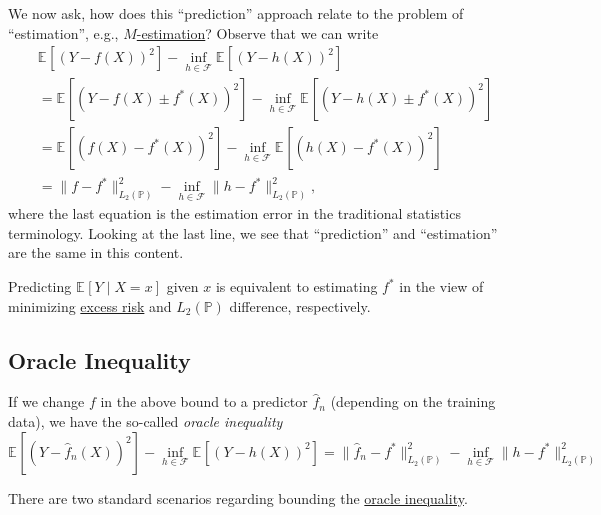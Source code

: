 We now ask, how does this ``prediction'' approach relate to the problem of ``estimation'', e.g., \hyperref[prb:M-estimation]{\(M\)-estimation}? Observe that we can write
\begin{align*}
	 & \mathbb{E}_{}\left[ ( Y - f(X) ) ^2 \right] - \inf _{h \in \mathscr{F} } \mathbb{E}_{}\left[( Y - h(X) ) ^2 \right]                                                      \\
	 & = \mathbb{E}_{}\left[ ( Y - f(X) \pm f^{\ast} (X) ) ^2 \right]  - \inf _{h \in \mathscr{F} } \mathbb{E}_{}\left[( Y - h(X) \pm f^{\ast} (X)) ^2 \right]                  \\
	 & = \mathbb{E}_{}\left[ ( f(X) - f^{\ast} (X) ) ^2 \right] - \inf _{h \in \mathscr{F} } \mathbb{E}_{}\left[( h(X) - f^{\ast} (X) ) ^2 \right] \tag*{cross terms are \(0\)} \\
	 & = \lVert f - f^{\ast}  \rVert _{L_2(\mathbb{P} )}^2 - \inf _{h\in \mathscr{F} } \lVert h - f^{\ast}  \rVert _{L_2(\mathbb{P} )} ^2,
\end{align*}
where the last equation is the estimation error in the traditional statistics terminology. Looking at the last line, we see that ``prediction'' and ``estimation'' are the same in this content.

\begin{intuition}
	Predicting \(\mathbb{E}_{}\left[Y \mid X = x \right] \) given \(x\) is equivalent to estimating \(f^{\ast} \) in the view of minimizing \hyperref[def:excess-risk]{excess risk} and \(L_2(\mathbb{P} )\) difference, respectively.
\end{intuition}

\subsection{Oracle Inequality}
If we change \(f\) in the above bound to a predictor \(\hat{f} _n \) (depending on the training data), we have the so-called \emph{oracle inequality}
\begin{equation}\label{eq:oracle-inequality}
	\mathbb{E}_{}\left[ ( Y - \hat{f} _n(X) ) ^2 \right] - \inf _{h \in \mathscr{F} } \mathbb{E}_{}\left[ ( Y - h(X) ) ^2 \right]
	= \lVert \hat{f} _n - f^{\ast}  \rVert _{L_2(\mathbb{P} )}^2 - \inf _{h\in \mathscr{F} } \lVert h - f^{\ast}  \rVert _{L_2(\mathbb{P} )} ^2
\end{equation}

There are two standard scenarios regarding bounding the \hyperref[eq:oracle-inequality]{oracle inequality}.

